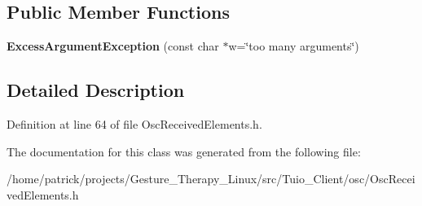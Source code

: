 \subsection*{Public Member Functions}
\begin{DoxyCompactItemize}
\item 
\mbox{\label{classosc_1_1_excess_argument_exception_a38b2426a05504b072978fb0b5a756f92}} 
{\bfseries Excess\+Argument\+Exception} (const char $\ast$w=\char`\"{}too many arguments\char`\"{})
\end{DoxyCompactItemize}


\subsection{Detailed Description}


Definition at line 64 of file Osc\+Received\+Elements.\+h.



The documentation for this class was generated from the following file\+:\begin{DoxyCompactItemize}
\item 
/home/patrick/projects/\+Gesture\+\_\+\+Therapy\+\_\+\+Linux/src/\+Tuio\+\_\+\+Client/osc/Osc\+Received\+Elements.\+h\end{DoxyCompactItemize}
